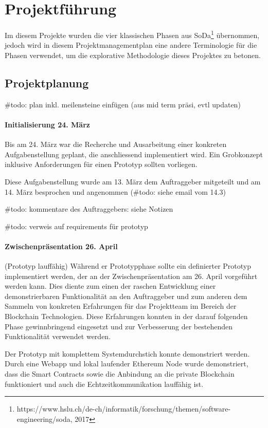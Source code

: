 \section{Projektführung}
Im diesem Projekte wurden die vier klassischen Phasen aus SoDa\footnote{https://www.hslu.ch/de-ch/informatik/forschung/themen/software-engineering/soda, 2017} übernommen, jedoch wird in diesem Projektmanagementplan eine andere Terminologie für die Phasen verwendet, um die explorative Methodologie dieses Projektes zu betonen.

\subsection{Projektplanung}
\#todo: plan inkl. meilensteine einfügen (aus mid term präsi, evtl updaten)

\paragraph{Initialisierung 24. März}
\label{pm_para:Initialisierung}
Bis am 24. März war die Recherche und Ausarbeitung einer konkreten Aufgabenstellung geplant, die anschliessend implementiert wird. Ein Grobkonzept inklusive Anforderungen für einen Prototyp sollten vorliegen.

Diese Aufgabenstellung wurde am 13. März dem Auftraggeber mitgeteilt und am 14. März besprochen und angenommen (\#todo: siehe email vom 14.3)

\#todo: kommentare des Auftraggebers: siehe Notizen

\#todo: verweis auf requirements für prototyp

\paragraph{Zwischenpräsentation 26. April}
(Prototyp lauffähig) Während er Prototypphase sollte ein definierter Prototyp implementiert werden, der an der Zwischenpräsentation am 26. April vorgeführt werden kann. Dies diente zum einen der raschen Entwicklung einer demonstrierbaren Funktionalität an den Auftraggeber und zum anderen dem Sammeln von konkreten Erfahrungen für das Projektteam im Bereich der Blockchain Technologien. Diese Erfahrungen konnten in der darauf folgenden Phase gewinnbringend eingesetzt und zur Verbesserung der bestehenden Funktionalität verwendet werden.

Der Prototyp mit komplettem Systemdurchstich konnte demonstriert werden. Durch eine Webapp und lokal laufender Ethereum Node wurde demonstriert, dass die Smart Contracts sowie die Anbindung an die private Blockchain funktioniert und auch die Echtzeitkommunikation lauffähig ist.

